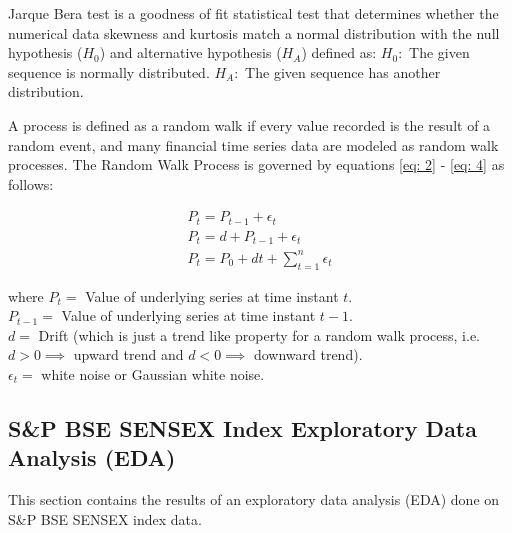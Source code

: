 \documentclass[conference]{IEEEtran}
\begin{document}
Jarque Bera test is a goodness of fit statistical test that determines whether the numerical data skewness and kurtosis match a normal distribution \cite{b18} with the null hypothesis ($H_{0}$) and alternative hypothesis ($H_{A}$) defined as: \newline
$H_{0}: $ The given sequence is normally distributed. \newline
$H_{A}: $ The given sequence has another distribution.

A process is defined as a random walk if every value recorded is the result of a random event, and many financial time series data are modeled as random walk processes.
The Random Walk Process is governed by equations \eqref{eq: 2} - \eqref{eq: 4} as follows:

\begin{align}
    P_{t} = P_{t - 1} + \epsilon_{t} \label{eq: 2} \\
    P_{t} = d + P_{t - 1} + \epsilon_{t} \label{eq: 3} \\
    P_{t} = P_{0} + dt + \sum_{t = 1}^{n} \epsilon_{t} 
    \label{eq: 4}
\end{align}

\noindent where $P_{t} = $ Value of underlying series at time instant $t$. \\
$P_{t - 1} = $  Value of underlying series at time instant $t - 1$. \\
$d = $ Drift (which is just a trend like property for a random walk process, i.e.\\ $d > 0 \implies$ upward trend and $d < 0 \implies$ downward trend).\\
$\epsilon_{t} = $ white noise or Gaussian white noise.

\subsection{S\&P BSE SENSEX Index Exploratory Data Analysis (EDA)}
This section contains the results of an exploratory data analysis (EDA) done on S\&P BSE SENSEX index data.
\end{document}
